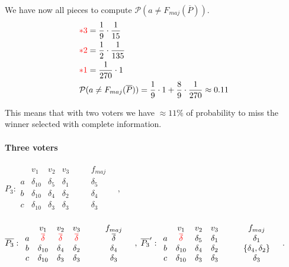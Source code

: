\documentclass[version=3.21, pagesize, twoside=off, bibliography=totoc, DIV=calc, fontsize=12pt, a4paper]{scrartcl}
\begin{document}
We have now all pieces to compute $\mathcal{P}(a\neq F_{maj}(\overline{P}))$. \begin{align}
	&{\color{red}*3} = \frac{1}{9} \cdot \frac{1}{15} \\
	&{\color{red}*2} =\frac{1}{2} \cdot \frac{1}{135} \\
	&{\color{red}*1} =\frac{1}{270} \cdot 1 \\
	&\mathcal{P}(a\neq F_{maj}(\overline{P})) = \frac{1}{9} \cdot 1 + \frac{8}{9} \cdot \frac{1}{270} \approx 0.11
\end{align}

This means that with two voters we have $\approx 11\%$ of probability to miss the winner selected with complete information.

\paragraph{Three voters}
\begin{center}
	$P_3:
	\begin{array}{cccccc}
		& v_1 & v_2 &v_3 & \quad & f_{maj} \\
		a &	\delta_{10} & \delta_5 & \delta_1 & \quad& \delta_5 \\
		b &	\delta_{10} & \delta_4 & \delta_2 &\quad& \delta_4 \\
		c &	\delta_{10} & \delta_3 & \delta_3 &\quad& \delta_3 \\
	\end{array} \quad, \qquad
	$
\end{center}
\begin{center}
	$\overline{P_3}:
	\begin{array}{cccccc}
		& v_1 & v_2 &v_3 & \quad & f_{maj} \\
		a &	{\color{red}\overline{\delta}} & {\color{red}\overline{\delta}} & {\color{red}\overline{\delta}} & \quad& \overline{\delta} \\
		b &	\delta_{10} & \delta_4 & \delta_2 &\quad& \delta_4 \\
		c &	\delta_{10} & \delta_3 & \delta_3 &\quad& \delta_3 \\
	\end{array} \quad,
	$
	$\overline{P_3}':
	\begin{array}{cccccc}
		& v_1 & v_2 &v_3 & \quad & f_{maj} \\
		a &	{\color{red}\overline{\delta}} & \delta_5 & \delta_1 & \quad& \delta_1 \\
		b &	\delta_{10} & \delta_4 & \delta_2 &\quad& \{\delta_4, \delta_2 \}\\
		c &	\delta_{10} & \delta_3 & \delta_3 &\quad& \delta_3 \\
	\end{array} \quad.
	$
\end{center}
\end{document}
